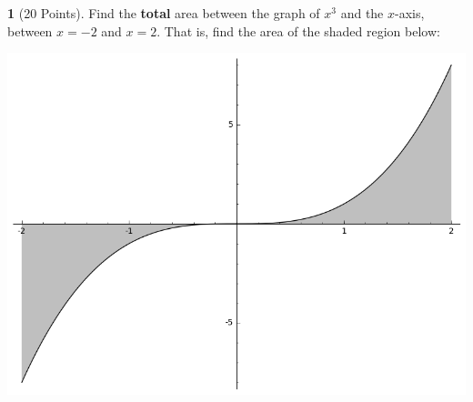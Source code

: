 \documentclass[12pt]{amsart}
\theoremstyle{definition}
\newtheorem{thm}{}
\theoremstyle{definition}
\begin{document}
\begin{thm}[20 Points]
  Find the {\bf total} area between the graph of $x^3$ and the $x$-axis, between $x = -2$ and $x = 2$.
  That is, find the area of the shaded region below:
  \begin{center}
    \includegraphics[scale=0.5]{imgs/areaBetweenCurves.png}
  \end{center}
\end{thm}
\end{document}

